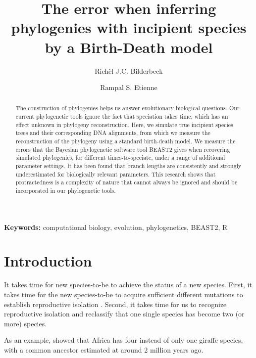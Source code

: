 \documentclass{article}
\title{The error when inferring phylogenies with incipient species by a Birth-Death model}
\author[1]{Rich\`el J.C. Bilderbeek}
\author[1]{Rampal S. Etienne}
\affil[1]{Groningen Institute for Evolutionary Life Sciences, University of Groningen, Groningen, The Netherlands}
\begin{document}
\maketitle

\begin{abstract}

  The construction of phylogenies helps us answer evolutionary biological
  questions.
  Our current phylogenetic tools ignore the fact that speciation takes time,
  which has an effect unknown in phylogeny reconstruction.
  Here, we simulate true incipient species trees and their corresponding
  DNA alignments, from which we measure the reconstruction of the phylogeny
  using a standard birth-death model.
  We measure the errors that the Bayesian phylogenetic software tool BEAST2
  gives when recovering simulated phylogenies, for different times-to-speciate,
  under a range of additional parameter settings.
  It has been found that branch lengths are consistently and strongly 
  underestimated for biologically relevant parameters.
  This research shows that protractedness is a complexity of nature that
  cannot always be ignored and should be incorporated in our phylogenetic
  tools.

\end{abstract}

{\bf Keywords:} computational biology, evolution, phylogenetics, BEAST2, R

\section{Introduction}


It takes time for new species-to-be to achieve the status of a new species.
First, it takes time for the new species-to-be 
to acquire sufficient different mutations to 
establish reproductive isolation \cite{schluter2001ecology}. Second, 
it takes time for us to recognize reproductive isolation
and reclassify that one single species has become two 
(or more) species. 


As an example, \cite{fennessy2016multi} 
showed that Africa has four instead of only one
giraffe species, with a common ancestor estimated 
at around 2 million years ago.

\end{document}
